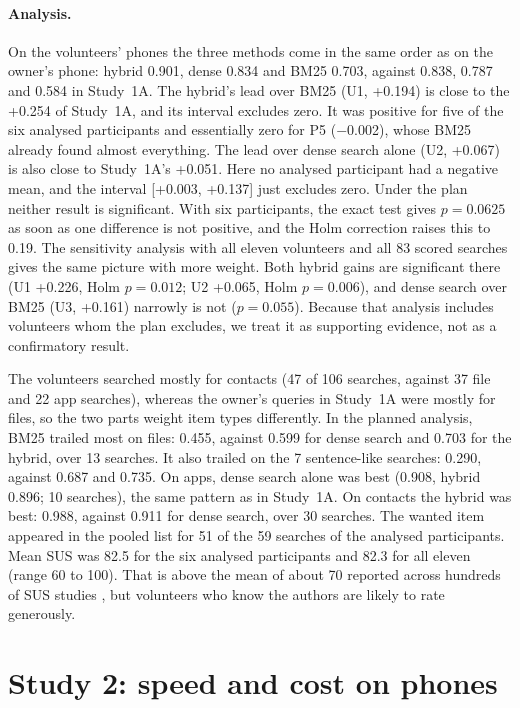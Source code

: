 \documentclass[pdflatex,sn-basic,Numbered]{sn-jnl}
\begin{document}
\paragraph{Analysis.} On the volunteers' phones the three methods come in the same order as on the owner's phone: hybrid 0.901, dense 0.834 and BM25 0.703, against 0.838, 0.787 and 0.584 in Study~1A. The hybrid's lead over BM25 (U1, +0.194) is close to the +0.254 of Study~1A, and its interval excludes zero. It was positive for five of the six analysed participants and essentially zero for P5 ($-$0.002), whose BM25 already found almost everything. The lead over dense search alone (U2, +0.067) is also close to Study~1A's +0.051. Here no analysed participant had a negative mean, and the interval [+0.003, +0.137] just excludes zero. Under the plan neither result is significant. With six participants, the exact test gives $p=0.0625$ as soon as one difference is not positive, and the Holm correction raises this to 0.19. The sensitivity analysis with all eleven volunteers and all 83 scored searches gives the same picture with more weight. Both hybrid gains are significant there (U1 +0.226, Holm $p=0.012$; U2 +0.065, Holm $p=0.006$), and dense search over BM25 (U3, +0.161) narrowly is not ($p=0.055$). Because that analysis includes volunteers whom the plan excludes, we treat it as supporting evidence, not as a confirmatory result.

The volunteers searched mostly for contacts (47 of 106 searches, against 37 file and 22 app searches), whereas the owner's queries in Study~1A were mostly for files, so the two parts weight item types differently. In the planned analysis, BM25 trailed most on files: 0.455, against 0.599 for dense search and 0.703 for the hybrid, over 13 searches. It also trailed on the 7 sentence-like searches: 0.290, against 0.687 and 0.735. On apps, dense search alone was best (0.908, hybrid 0.896; 10 searches), the same pattern as in Study~1A. On contacts the hybrid was best: 0.988, against 0.911 for dense search, over 30 searches. The wanted item appeared in the pooled list for 51 of the 59 searches of the analysed participants. Mean SUS was 82.5 for the six analysed participants and 82.3 for all eleven (range 60 to 100). That is above the mean of about 70 reported across hundreds of SUS studies \citep{bangor2008sus}, but volunteers who know the authors are likely to rate generously.

\section{Study 2: speed and cost on phones}\label{sec:s2}
\end{document}
